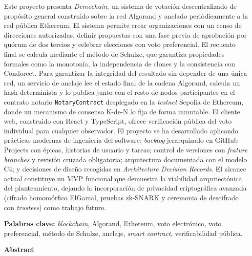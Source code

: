 Este proyecto presenta \emph{Demochain}, un sistema de votación
descentralizado de propósito general construido sobre la red Algorand
y anclado periódicamente a la red pública Ethereum. El sistema permite
crear organizaciones con un censo de direcciones autorizadas, definir
propuestas con una fase previa de aprobación por quórum de dos tercios
y celebrar elecciones con voto preferencial. El recuento final se
calcula mediante el método de Schulze, que garantiza propiedades
formales como la monotonía, la independencia de clones y la
consistencia con Condorcet. Para garantizar la integridad del resultado
sin depender de una única red, un servicio de anclaje lee el estado
final de la cadena Algorand, calcula un hash determinista y lo publica
junto con el resto de nodos participantes en el contrato notario
\texttt{NotaryContract} desplegado en la \emph{testnet} Sepolia de
Ethereum, donde un mecanismo de consenso K-de-N lo fija de forma
inmutable. El cliente web, construido con React y TypeScript, ofrece
verificación pública del voto individual para cualquier observador. El
proyecto se ha desarrollado aplicando prácticas modernas de ingeniería
del software: \emph{backlog} jerarquizado en GitHub Projects con
épicas, historias de usuario y tareas; control de versiones con
\emph{feature branches} y revisión cruzada obligatoria; arquitectura
documentada con el modelo C4; y decisiones de diseño recogidas en
\emph{Architecture Decision Records}. El alcance actual constituye un
MVP funcional que demuestra la viabilidad arquitectónica del
planteamiento, dejando la incorporación de privacidad criptográfica
avanzada (cifrado homomórfico ElGamal, pruebas zk-SNARK y ceremonia de
descifrado con \emph{trustees}) como trabajo futuro.

\textbf{Palabras clave:} \emph{blockchain}, Algorand, Ethereum, voto
electrónico, voto preferencial, método de Schulze, anclaje, \emph{smart
contract}, verificabilidad pública.

\vspace{1cm}
\begin{center}\textbf{\Large Abstract}\end{center}
\vspace{0.5cm}

